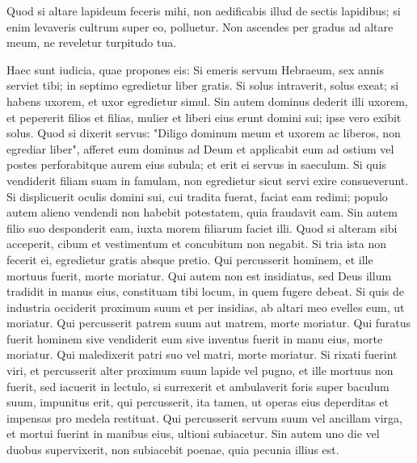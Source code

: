 \begin{biblechapter}
\begin{biblechapter}
\begin{biblechapter}
\begin{biblechapter}
\begin{biblechapter}
\begin{biblechapter}
\begin{biblechapter}
\begin{biblechapter}
\begin{biblechapter}
\begin{biblechapter}
\begin{biblechapter}
\begin{biblechapter}
\begin{biblechapter}
\begin{biblechapter}
\begin{biblechapter}
\begin{biblechapter}
\begin{biblechapter}
\begin{biblechapter}
\begin{biblechapter}
\begin{biblechapter}
\verse Quod si altare lapideum feceris mihi, non aedificabis illud de sectis lapidibus; si enim levaveris cultrum super eo, polluetur. 
\verse Non ascendes per gradus ad altare meum, ne reveletur turpitudo tua.
 
\begin{biblechapter}
\verse Haec sunt iudicia, quae propones eis:
 \verse Si emeris servum Hebraeum, sex annis serviet tibi; in septimo egredietur liber gratis. 
\verse Si solus intraverit, solus exeat; si habens uxorem, et uxor egredietur simul. 
\verse Sin autem dominus dederit illi uxorem, et pepererit filios et filias, mulier et liberi eius erunt domini sui; ipse vero exibit solus. 
\verse Quod si dixerit servus: "Diligo dominum meum et uxorem ac liberos, non egrediar liber", 
\verse afferet eum dominus ad Deum et applicabit eum ad ostium vel postes perforabitque aurem eius subula; et erit ei servus in saeculum.
 \verse Si quis vendiderit filiam suam in famulam, non egredietur sicut servi exire consueverunt. 
\verse Si displicuerit oculis domini sui, cui tradita fuerat, faciat eam redimi; populo autem alieno vendendi non habebit potestatem, quia fraudavit eam. 
\verse Sin autem filio suo desponderit eam, iuxta morem filiarum faciet illi. 
\verse Quod si alteram sibi acceperit, cibum et vestimentum et concubitum non negabit. 
\verse Si tria ista non fecerit ei, egredietur gratis absque pretio.
 \verse Qui percusserit hominem, et ille mortuus fuerit, morte moriatur. 
\verse Qui autem non est insidiatus, sed Deus illum tradidit in manus eius, constituam tibi locum, in quem fugere debeat. 
\verse Si quis de industria occiderit proximum suum et per insidias, ab altari meo evelles eum, ut moriatur.
 \verse Qui percusserit patrem suum aut matrem, morte moriatur.
 \verse Qui furatus fuerit hominem sive vendiderit eum sive inventus fuerit in manu eius, morte moriatur.
 \verse Qui maledixerit patri suo vel matri, morte moriatur.
 \verse Si rixati fuerint viri, et percusserit alter proximum suum lapide vel pugno, et ille mortuus non fuerit, sed iacuerit in lectulo, 
\verse si surrexerit et ambulaverit foris super baculum suum, impunitus erit, qui percusserit, ita tamen, ut operas eius deperditas et impensas pro medela restituat.
 \verse Qui percusserit servum suum vel ancillam virga, et mortui fuerint in manibus eius, ultioni subiacetur. 
\verse Sin autem uno die vel duobus supervixerit, non subiacebit poenae, quia pecunia illius est.

\end{biblechapter}
\end{biblechapter}
\end{biblechapter}
\end{biblechapter}
\end{biblechapter}
\end{biblechapter}
\end{biblechapter}
\end{biblechapter}
\end{biblechapter}
\end{biblechapter}
\end{biblechapter}
\end{biblechapter}
\end{biblechapter}
\end{biblechapter}
\end{biblechapter}
\end{biblechapter}
\end{biblechapter}
\end{biblechapter}
\end{biblechapter}
\end{biblechapter}
\end{biblechapter}
